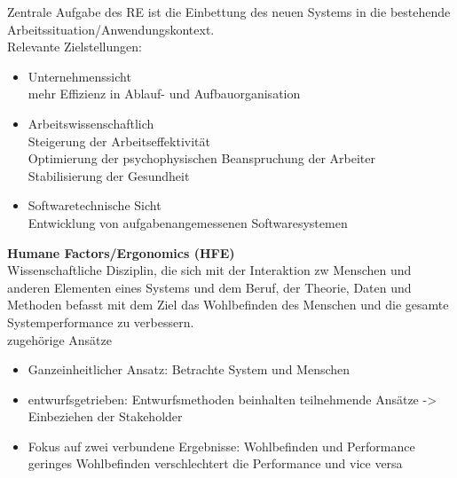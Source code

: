 Zentrale Aufgabe des RE ist die Einbettung des neuen Systems in die bestehende Arbeitssituation/Anwendungskontext.\\
Relevante Zielstellungen:
\begin{itemize}
	\item Unternehmenssicht\\
	mehr Effizienz in Ablauf- und Aufbauorganisation
	
	\item Arbeitswissenschaftlich\\
	Steigerung der Arbeitseffektivität\\
	Optimierung der psychophysischen Beanspruchung der Arbeiter\\
	Stabilisierung der Gesundheit
	
	\item Softwaretechnische Sicht\\
	Entwicklung von aufgabenangemessenen Softwaresystemen
\end{itemize}

\textbf{Humane Factors/Ergonomics (HFE)}\\
Wissenschaftliche Disziplin, die sich mit der Interaktion zw Menschen und anderen Elementen eines Systems und dem Beruf, der Theorie, Daten und Methoden befasst mit dem Ziel das Wohlbefinden des Menschen und die gesamte Systemperformance zu verbessern.\\
zugehörige Ansätze
\begin{itemize}
	\item Ganzeinheitlicher Ansatz: Betrachte System und Menschen
	\item entwurfsgetrieben: Entwurfsmethoden beinhalten teilnehmende Ansätze -> Einbeziehen der Stakeholder
	\item Fokus auf zwei verbundene Ergebnisse: Wohlbefinden und Performance\\
	geringes Wohlbefinden verschlechtert die Performance und vice versa 
\end{itemize}
